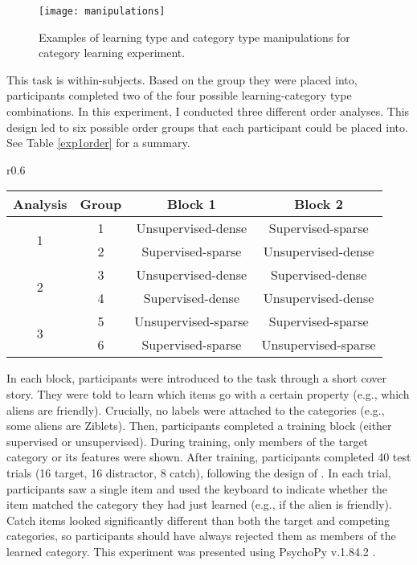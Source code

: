 \documentclass[../dissertation.tex]{subfiles}
\begin{document}
\begin{figure}[htp]
\texttt{[image: manipulations]}
\caption[Example stimuli for category learning task]{Examples of learning type and category type manipulations for category learning experiment.}
\vspace{-10pt}
\label{sloutskymanip}
\end{figure}
	This task is within-subjects. Based on the group they were placed into, participants completed two of the four possible learning-category type combinations. In this experiment, I conducted three different order analyses. This design led to six possible order groups that each participant could be placed into. See Table \ref{exp1order} for a summary. 

\begin{wraptable}[11]{r}{0.6\linewidth}
\caption{Block orders for statistical density task}
\begin{center}
\begin{tabular}{ c|c|c|c } 
 \hline 
 Analysis & Group & Block 1 & Block 2 \\ 
 \hline
 \multirow{2}{*}{1} & 1 & Unsupervised-dense & Supervised-sparse \\ 
 & 2 & Supervised-sparse & Unsupervised-dense \\ 
 \hline
  \multirow{2}{*}{2} & 3 & Unsupervised-dense & Supervised-dense \\ 
 & 4 & Supervised-dense & Unsupervised-dense \\
 \hline 
  \multirow{2}{*}{3} & 5 & Unsupervised-sparse & Supervised-sparse \\ 
 & 6 & Supervised-sparse & Unsupervised-sparse \\ 
 \hline
\end{tabular}
\end{center}
\vspace{-20pt}
\label{exp1order}
\end{wraptable} \par
 In each block, participants were introduced to the task through a short cover story. They were told to learn which items go with a certain property (e.g., which aliens are friendly). Crucially, no labels were attached to the categories (e.g., some aliens are Ziblets). Then, participants completed a training block (either supervised or unsupervised). During training, only members of the target category or its features were shown. After training, participants completed 40 test trials (16 target, 16 distractor, 8 catch), following the design of \citet{Kloos2008}. In each trial, participants saw a single item and used the keyboard to indicate whether the item matched the category they had just learned (e.g., if the alien is friendly). Catch items looked significantly different than both the target and competing categories, so participants should have always rejected them as members of the learned category. This experiment was presented using PsychoPy v.1.84.2 \citep{Peirce2007}. \par
\end{document}
